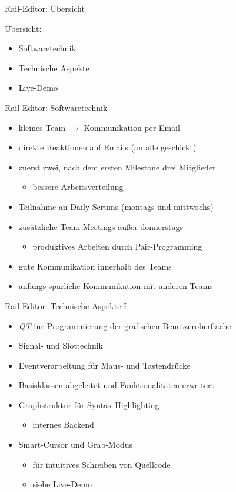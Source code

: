 \begin{frame}{Rail-Editor: Übersicht}

	Übersicht:
	\begin{itemize}
		\item Softwaretechnik
		\item Technische Aspekte
		\item Live-Demo
	\end{itemize}

\end{frame}

\pagebreak

\begin{frame}{Rail-Editor: Softwaretechnik}
	\begin{itemize}
		\item kleines Team $\rightarrow$ Kommunikation per Email
		\item direkte Reaktionen auf Emails (an alle geschickt)
		\item zuerst zwei, nach dem ersten Milestone drei Mitglieder
		\begin{itemize}
			\item bessere Arbeitsverteilung
		\end{itemize}
		\item Teilnahme an Daily Scrums (montags und mittwochs)
		\item zusätzliche Team-Meetings außer donnerstags
		\begin{itemize}
			\item produktives Arbeiten durch Pair-Programming
		\end{itemize}
		\item gute Kommunikation innerhalb des Teams
		\item anfangs spärliche Kommunikation mit anderen Teams
	\end{itemize}
\end{frame}

\begin{frame}{Rail-Editor: Technische Aspekte I}
	\begin{itemize}
		\item \textit{QT} für Programmierung der grafischen Benutzeroberfläche
		\item Signal- und Slottechnik
		\item Eventverarbeitung für Maus- und Tastendrücke
		\item Basisklassen abgeleitet und Funktionalitäten erweitert
		\item Graphstruktur für Syntax-Highlighting
		\begin{itemize}
			\item internes Backend
		\end{itemize}
		\item Smart-Cursor und Grab-Modus
		\begin{itemize}
			\item für intuitives Schreiben von Quellcode
			\item siehe Live-Demo
		\end{itemize}
	\end{itemize}
\end{frame}

